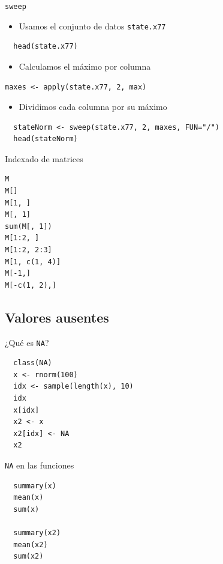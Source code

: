 \documentclass[xcolor={usenames,svgnames,dvipsnames}]{beamer}
\begin{document}
\begin{frame}[fragile,label=sec-2-2-7]{\texttt{sweep}}
 \begin{itemize}
\item Usamos el conjunto de datos \texttt{state.x77}
\end{itemize}
\lstset{language=R,label= ,caption= ,numbers=none}
\begin{lstlisting}
  head(state.x77)
\end{lstlisting}
\begin{itemize}
\item Calculamos el máximo por columna
\end{itemize}
\lstset{language=R,label= ,caption= ,numbers=none}
\begin{lstlisting}
maxes <- apply(state.x77, 2, max)
\end{lstlisting}
\begin{itemize}
\item Dividimos cada columna por su máximo
\end{itemize}
\lstset{language=R,label= ,caption= ,numbers=none}
\begin{lstlisting}
  stateNorm <- sweep(state.x77, 2, maxes, FUN="/")
  head(stateNorm)
\end{lstlisting}
\end{frame}

\begin{frame}[fragile,label=sec-2-2-8]{Indexado de matrices}
 \lstset{language=R,label= ,caption= ,numbers=none}
\begin{lstlisting}
M
M[]
M[1, ]
M[, 1]
sum(M[, 1])
M[1:2, ]
M[1:2, 2:3]
M[1, c(1, 4)]
M[-1,]
M[-c(1, 2),]
\end{lstlisting}
\end{frame}


\subsection{Valores ausentes}
\label{sec-2-3}

\begin{frame}[fragile,label=sec-2-3-1]{¿Qué es \texttt{NA}?}
 \lstset{language=R,label= ,caption= ,numbers=none}
\begin{lstlisting}
  class(NA)
  x <- rnorm(100)
  idx <- sample(length(x), 10)
  idx
  x[idx]
  x2 <- x
  x2[idx] <- NA
  x2
\end{lstlisting}
\end{frame}

\begin{frame}[fragile,label=sec-2-3-2]{\texttt{NA} en las funciones}
 \lstset{language=R,label= ,caption= ,numbers=none}
\begin{lstlisting}
  summary(x)
  mean(x)
  sum(x)
  
  summary(x2)
  mean(x2)
  sum(x2)
\end{lstlisting}
\end{frame}
\end{document}
